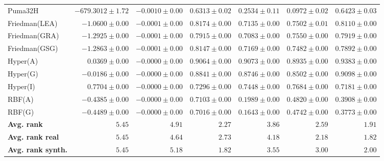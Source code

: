\begin{table*}[!htbp]
{\begin{tabular}{lrrrrrr}
		Puma32H & $-679.3012 \pm 1.72$ & $-0.0010 \pm 0.00$ & $0.6313 \pm 0.02$ & $0.2534 \pm 0.11$ & $0.0972 \pm 0.02$ & $\mathbf{0.6423 \pm 0.03}$\\
		Friedman(LEA) & $-1.0600 \pm 0.00$ & $-0.0001 \pm 0.00$ & $\mathbf{0.8174 \pm 0.00}$ & $0.7135 \pm 0.00$ & $0.7502 \pm 0.01$ & $0.8110 \pm 0.00$\\
		Friedman(GRA) & $-1.2925 \pm 0.00$ & $-0.0001 \pm 0.00$ & $0.7915 \pm 0.00$ & $0.7083 \pm 0.00$ & $0.7550 \pm 0.00$ & $\mathbf{0.7919 \pm 0.00}$\\
		Friedman(GSG) & $-1.2863 \pm 0.00$ & $-0.0001 \pm 0.00$ & $\mathbf{0.8147 \pm 0.00}$ & $0.7169 \pm 0.00$ & $0.7482 \pm 0.00$ & $0.7892 \pm 0.00$\\
		Hyper(A) & $0.0369 \pm 0.00$ & $-0.0000 \pm 0.00$ & $0.9064 \pm 0.00$ & $0.9073 \pm 0.00$ & $0.8935 \pm 0.00$ & $\mathbf{0.9383 \pm 0.00}$\\
		Hyper(G) & $-0.0186 \pm 0.00$ & $-0.0000 \pm 0.00$ & $0.8841 \pm 0.00$ & $0.8746 \pm 0.00$ & $0.8502 \pm 0.00$ & $\mathbf{0.9098 \pm 0.00}$\\
		Hyper(I) & $\mathbf{0.7704 \pm 0.00}$ & $-0.0000 \pm 0.00$ & $0.7296 \pm 0.00$ & $0.7448 \pm 0.00$ & $0.7684 \pm 0.00$ & $0.7181 \pm 0.00$\\
		RBF(A) & $-0.4385 \pm 0.00$ & $-0.0000 \pm 0.00$ & $\mathbf{0.7103 \pm 0.00}$ & $0.1989 \pm 0.00$ & $0.4820 \pm 0.00$ & $0.3908 \pm 0.00$\\
		RBF(G) & $-0.4489 \pm 0.00$ & $-0.0000 \pm 0.00$ & $\mathbf{0.7016 \pm 0.00}$ & $0.1643 \pm 0.00$ & $0.4742 \pm 0.00$ & $0.3773 \pm 0.00$\\
		\midrule
		\textbf{{Avg. rank}} & $5.45$ & $4.91$ & $2.27$ & $3.86$ & $2.59$ & $\mathbf{1.91}$\\
		\textbf{{Avg. rank real}} & $5.45$ & $4.64$ & $2.73$ & $4.18$ & $2.18$ & $\mathbf{1.82}$\\
		\textbf{{Avg. rank synth.}} & $5.45$ & $5.18$ & $\mathbf{1.82}$ & $3.55$ & $3.00$ & $2.00$\\
		\bottomrule
	\end{tabular}}
\end{table*}
